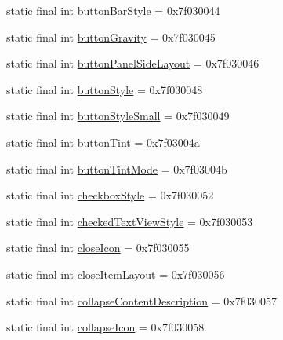 \begin{DoxyCompactItemize}
\item 
static final int \mbox{\hyperlink{classandroid_1_1support_1_1v7_1_1appcompat_1_1R_1_1attr_ae1d3830a3bd9657ba6612489fa0472da}{button\+Bar\+Style}} = 0x7f030044
\item 
static final int \mbox{\hyperlink{classandroid_1_1support_1_1v7_1_1appcompat_1_1R_1_1attr_ac46d4436bacc662abc978739c43817a8}{button\+Gravity}} = 0x7f030045
\item 
static final int \mbox{\hyperlink{classandroid_1_1support_1_1v7_1_1appcompat_1_1R_1_1attr_a658402b828e18d0af90a63eb4216a609}{button\+Panel\+Side\+Layout}} = 0x7f030046
\item 
static final int \mbox{\hyperlink{classandroid_1_1support_1_1v7_1_1appcompat_1_1R_1_1attr_ac1aeb27497dca91db3ac44616d3f94e2}{button\+Style}} = 0x7f030048
\item 
static final int \mbox{\hyperlink{classandroid_1_1support_1_1v7_1_1appcompat_1_1R_1_1attr_a7f18133bc54befe178c708e27b8cf88a}{button\+Style\+Small}} = 0x7f030049
\item 
static final int \mbox{\hyperlink{classandroid_1_1support_1_1v7_1_1appcompat_1_1R_1_1attr_aeb07ad1e687cb0f37520e237cd212f87}{button\+Tint}} = 0x7f03004a
\item 
static final int \mbox{\hyperlink{classandroid_1_1support_1_1v7_1_1appcompat_1_1R_1_1attr_ab1671f07575b937859e3b00a452dd65a}{button\+Tint\+Mode}} = 0x7f03004b
\item 
static final int \mbox{\hyperlink{classandroid_1_1support_1_1v7_1_1appcompat_1_1R_1_1attr_aff66bca5655717563e1cbd26eb6e1d9b}{checkbox\+Style}} = 0x7f030052
\item 
static final int \mbox{\hyperlink{classandroid_1_1support_1_1v7_1_1appcompat_1_1R_1_1attr_a6335909bf985d3026fa7fc82c5947223}{checked\+Text\+View\+Style}} = 0x7f030053
\item 
static final int \mbox{\hyperlink{classandroid_1_1support_1_1v7_1_1appcompat_1_1R_1_1attr_a418afef4769ee5513b3e569a5969e3bb}{close\+Icon}} = 0x7f030055
\item 
static final int \mbox{\hyperlink{classandroid_1_1support_1_1v7_1_1appcompat_1_1R_1_1attr_a2306aa8d26074c7e03bbb2a1de1d5e77}{close\+Item\+Layout}} = 0x7f030056
\item 
static final int \mbox{\hyperlink{classandroid_1_1support_1_1v7_1_1appcompat_1_1R_1_1attr_af318b94addf84108f62d909296cf4f98}{collapse\+Content\+Description}} = 0x7f030057
\item 
static final int \mbox{\hyperlink{classandroid_1_1support_1_1v7_1_1appcompat_1_1R_1_1attr_ac297c2f0d5bfe33370c62cbed69c8aec}{collapse\+Icon}} = 0x7f030058

\end{DoxyCompactItemize}
